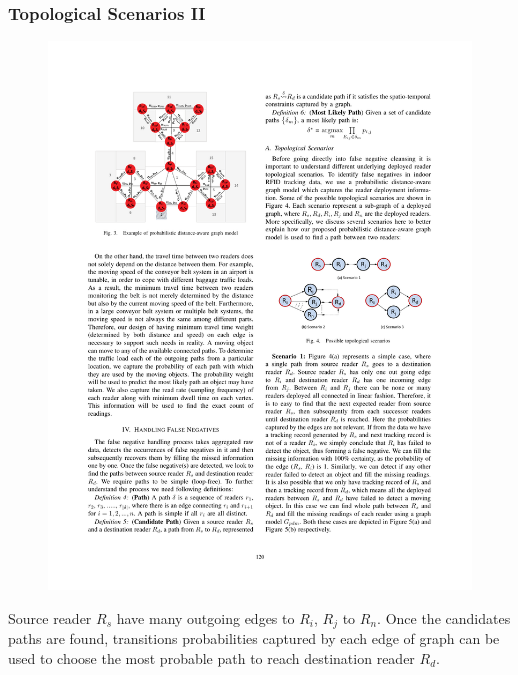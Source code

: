 \begin{frame}
\frametitle{Topological Scenarios II}

\begin{figure}[tb]
  \includegraphics[width=0.6\columnwidth]{figures/3-3/3-3-5.pdf}
\end{figure}
\vspace{-10pt}
Source reader $R_s$ have many outgoing edges to $R_i$, $R_j$ to $R_n$. Once the candidates paths are found, transitions probabilities captured by each edge of graph can be used to choose the most probable path to reach destination reader $R_d$.

\end{frame}


